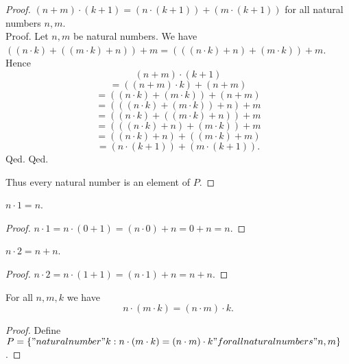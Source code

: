 \documentclass[../../natural-numbers.ftl.tex]{subfiles}
\begin{document}
\begin{forthel}
\begin{proof}
        $(n + m) \cdot (k + 1) = (n \cdot (k + 1)) + (m \cdot (k + 1))$ for all
        natural numbers $n,m$. \\
        Proof.
          Let $n,m$ be natural numbers.
          We have $((n \cdot k) + ((m \cdot k) + n)) + m =
          (((n \cdot k) + n) + (m \cdot k)) + m$.
          Hence
          $$(n + m) \cdot (k + 1)$$
          $$= ((n + m) \cdot k) + (n + m)$$
          $$= ((n \cdot k) + (m \cdot k)) + (n + m)$$
          $$= (((n \cdot k) + (m \cdot k)) + n) + m$$
          $$= ((n \cdot k) + ((m \cdot k) + n)) + m$$
          $$= (((n \cdot k) + n) + (m \cdot k)) + m$$
          $$= ((n \cdot k) + n) + ((m \cdot k) + m)$$
          $$= (n \cdot (k + 1)) + (m \cdot (k + 1)).$$
        Qed.
      Qed.

      Thus every natural number is an element of $P$.
    \end{proof}


    \begin{proposition}[NN 01 03 866630]
      $n \cdot 1 = n$.
    \end{proposition}
    \begin{proof}
      $ n \cdot 1
      = n \cdot (0 + 1)   %
      = (n \cdot 0) + n   %
      = 0 + n             %
      = n$.               %
    \end{proof}


    \begin{corollary}[NN 01 03 302621]
    $n \cdot 2 = n + n$.
    \end{corollary}
    \begin{proof}
      $ n \cdot 2
      = n \cdot (1 + 1)   %
      = (n \cdot 1) + n   %
      = n + n$.           %
    \end{proof}


    \begin{proposition}[NN 01 03 299637]
      For all $n,m,k$ we have
      $$n \cdot (m \cdot k) = (n \cdot m) \cdot k.$$
    \end{proposition}
    \begin{proof}
      Define $P = \{ "natural number" k : n \cdot (m \cdot k) = (n \cdot m) \cdot k "for all natural numbers" n,m \}$.


\end{proof}
\end{forthel}
\end{document}
